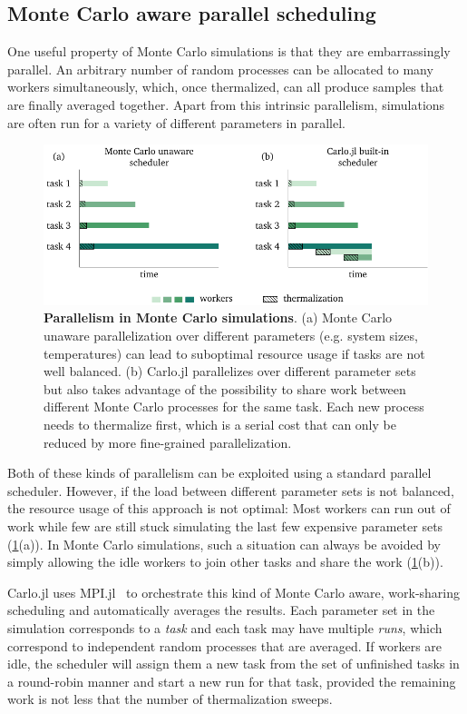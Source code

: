 \documentclass{SciPost}
\begin{document}
\subsection{Monte Carlo aware parallel scheduling}
One useful property of Monte Carlo simulations is that they are embarrassingly parallel. An arbitrary number of random processes can be allocated to many workers simultaneously, which, once thermalized, can all produce samples that are finally averaged together. Apart from this intrinsic parallelism, simulations are often run for a variety of different parameters in parallel.
\begin{figure}
\includegraphics{figs/scheduling.pdf}
\caption{\textbf{Parallelism in Monte Carlo simulations}. (a) Monte Carlo unaware parallelization over different parameters (e.g. system sizes, temperatures) can lead to suboptimal resource usage if tasks are not well balanced. (b) Carlo.jl parallelizes over different parameter sets but also takes advantage of the possibility to share work between different Monte Carlo processes for the same task. Each new process needs to thermalize first, which is a serial cost that can only be reduced by more fine-grained parallelization.}
\label{fig:mcsched}
\end{figure}
Both of these kinds of parallelism can be exploited using a standard parallel scheduler. However, if the load between different parameter sets is not balanced, the resource usage of this approach is not optimal: Most workers can run out of work while few are still stuck simulating the last few expensive parameter sets (\cref{fig:mcsched}(a)). In Monte Carlo simulations, such a situation can always be avoided by simply allowing the idle workers to join other tasks and share the work (\cref{fig:mcsched}(b)).

Carlo.jl uses MPI.jl~\cite{Byrne2021} to orchestrate this kind of Monte Carlo aware, work-sharing scheduling and automatically averages the results. Each parameter set in the simulation corresponds to a \textit{task} and each task may have multiple \textit{runs}, which correspond to independent random processes that are averaged. If workers are idle, the scheduler will assign them a new task from the set of unfinished tasks in a round-robin manner and start a new run for that task, provided the remaining work is not less that the number of thermalization sweeps.
\end{document}
